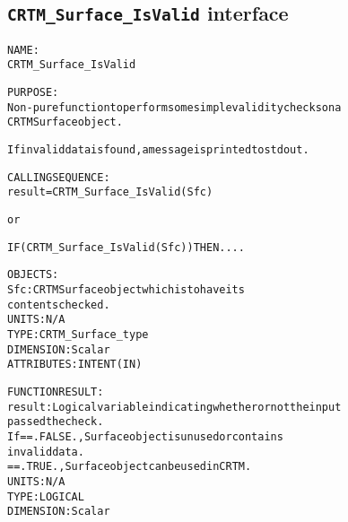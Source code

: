 \subsection{\texttt{CRTM\_Surface\_IsValid} interface}
  \label{sec:CRTM_Surface_IsValid_interface}
  \begin{alltt}
 
  NAME:
        CRTM_Surface_IsValid
 
  PURPOSE:
        Non-pure function to perform some simple validity checks on a
        CRTM Surface object. 
 
        If invalid data is found, a message is printed to stdout.
 
  CALLING SEQUENCE:
        result = CRTM_Surface_IsValid( Sfc )
 
          or
 
        IF ( CRTM_Surface_IsValid( Sfc ) ) THEN....
 
  OBJECTS:
        Sfc:       CRTM Surface object which is to have its
                   contents checked.
                   UNITS:      N/A
                   TYPE:       CRTM_Surface_type
                   DIMENSION:  Scalar
                   ATTRIBUTES: INTENT(IN)
 
  FUNCTION RESULT:
        result:    Logical variable indicating whether or not the input
                   passed the check.
                   If == .FALSE., Surface object is unused or contains
                                  invalid data.
                      == .TRUE.,  Surface object can be used in CRTM.
                   UNITS:      N/A
                   TYPE:       LOGICAL
                   DIMENSION:  Scalar
 
  \end{alltt}

